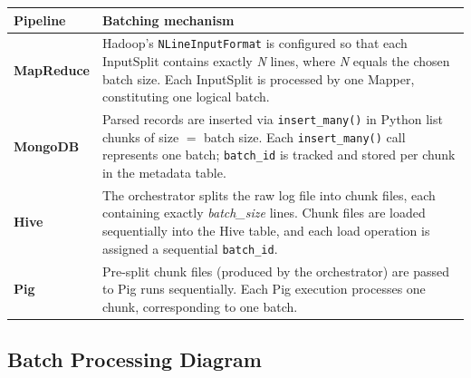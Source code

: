 \documentclass[11pt,a4paper]{article}
\begin{document}
\begin{center}
\renewcommand{\arraystretch}{1.4}
\begin{tabularx}{\linewidth}{@{} >{\bfseries\small}l X @{}}
\toprule
Pipeline & Batching mechanism \\
\midrule
MapReduce &
  Hadoop's \texttt{NLineInputFormat} is configured so that each InputSplit contains exactly \emph{N} lines, where \emph{N} equals the chosen batch size. Each InputSplit is processed by one Mapper, constituting one logical batch. \\[3pt]
MongoDB &
  Parsed records are inserted via \texttt{insert\_many()} in Python list chunks of size $= $ batch size. Each \texttt{insert\_many()} call represents one batch; \texttt{batch\_id} is tracked and stored per chunk in the metadata table. \\[3pt]
Hive &
  The orchestrator splits the raw log file into chunk files, each containing exactly \emph{batch\_size} lines. Chunk files are loaded sequentially into the Hive table, and each load operation is assigned a sequential \texttt{batch\_id}. \\[3pt]
Pig &
  Pre-split chunk files (produced by the orchestrator) are passed to Pig runs sequentially. Each Pig execution processes one chunk, corresponding to one batch. \\
\bottomrule
\end{tabularx}
\end{center}

\subsection{Batch Processing Diagram}
\end{document}

